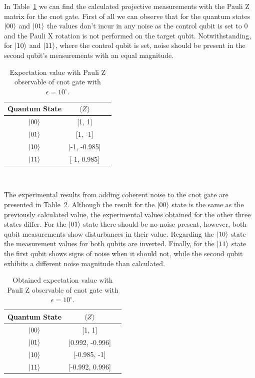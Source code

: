 In Table~\ref{tab:cnot_iso_noise} we can find the calculated
projective measurements with the Pauli Z matrix for the \ac{cnot} gate.
First of all we can observe that for the quantum states \(\ket{00}\)
and \(\ket{01}\) the values don't incur in any noise as the control
qubit is set to 0 and the Pauli X rotation is not performed on the target
qubit. Notwithstanding, for \(\ket{10}\) and \(\ket{11}\), where the
control qubit is set, noise should be present in the second qubit's
measurements with an equal magnitude. \

\begin{table}[h]
  \centering
  \begin{tabular}{|c|c|c|}
    \hline
    Quantum State & \(\expval{Z}\) \\
    \hline
    \(\ket{00}\) & [1, 1] \\
    \hline
    \(\ket{01}\) & [1, -1] \\
    \hline
    \(\ket{10}\) & [-1, -0.985] \\
    \hline
    \(\ket{11}\) & [-1, 0.985] \\
    \hline
  \end{tabular}
  \caption{Expectation value with Pauli Z observable of \ac{cnot} gate with \(\epsilon = 10^{\circ}\).}\label{tab:cnot_iso_noise}
\end{table} \

The experimental results from adding coherent noise to the
\ac{cnot} gate are presented in Table~\ref{tab:cnot_real_noise}.
Although the result for the \(\ket{00}\) state is the same as the
previously calculated value, the experimental values obtained for
the other three states differ. For the \(\ket{01}\) state there
should be no noise present, however, both qubit measurements
show disturbances in their value. Regarding the \(\ket{10}\) state
the measurement values for both qubits are inverted. Finally,
for the \(\ket{11}\) state the first qubit shows signs of noise
when it should not, while the second qubit exhibits a different noise
magnitude than calculated. \

\begin{table}[h]
  \centering
  \begin{tabular}{|c|c|c|}
    \hline
    Quantum State & \(\expval{Z}\) \\
    \hline
    \(\ket{00}\) & [1, 1] \\
    \hline
    \(\ket{01}\) & [0.992, -0.996] \\
    \hline
    \(\ket{10}\) & [-0.985, -1] \\
    \hline
    \(\ket{11}\) & [-0.992, 0.996] \\
    \hline
  \end{tabular}
  \caption{Obtained expectation value with Pauli Z observable of \ac{cnot} gate with \(\epsilon = 10^{\circ}\).}\label{tab:cnot_real_noise}
\end{table} \


